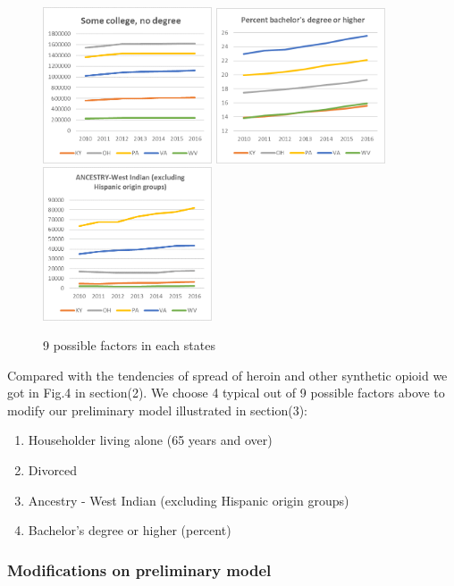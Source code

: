 \documentclass[12pt]{article}
\begin{document}
\begin{figure}[!htbp]
\includegraphics[width=5cm]{Fig/7}
\includegraphics[width=5cm]{Fig/8}
\includegraphics[width=5cm]{Fig/9}
\caption{9 possible factors in each states}
\end{figure}

Compared with the tendencies of spread of heroin and other synthetic opioid we got in Fig.4 in section(2). We choose 4 typical out of 9 possible factors above to modify our preliminary model illustrated in section(3):
 \begin{enumerate}[\bfseries (1)]
     \item Householder living alone (65 years and over)
     \item Divorced
     \item Ancestry - West Indian (excluding Hispanic origin groups)
     \item Bachelor's degree or higher (percent)
 \end{enumerate}
 
\subsubsection{Modifications on preliminary model}
\end{document}
